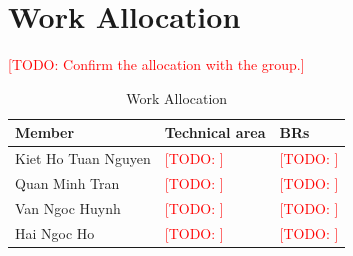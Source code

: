 \documentclass[peerreview]{IEEEtran}
\newcommand{\todo}[1]{\textcolor{red}{[TODO: #1]}}
\begin{document}
\section{Work Allocation}
\label{App:Work}

\todo{Confirm the allocation with the group.}

\begin{table}[!h]
\centering
\caption{Work Allocation}
\label{tab:work}
\footnotesize
\setlength{\tabcolsep}{4pt}
\begin{tabular}{L{2.6cm} L{3.4cm} L{1.6cm}}
\toprule
\textbf{Member} & \textbf{Technical area} & \textbf{BRs} \\
\midrule
Kiet Ho Tuan Nguyen & \todo{} & \todo{} \\
Quan Minh Tran & \todo{} & \todo{} \\
Van Ngoc Huynh & \todo{} & \todo{} \\
Hai Ngoc Ho & \todo{} & \todo{} \\
\bottomrule
\end{tabular}
\end{table}
\end{document}
